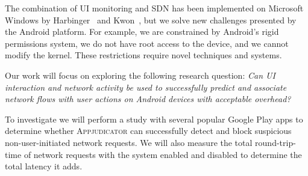 The combination of UI monitoring and SDN has been implemented on Microsoft Windows by Harbinger~\cite{chuluundorj2019} and Kwon~\etal \cite{kwon2011}, but we solve new challenges presented by the Android platform. For example, we are constrained by Android's rigid permissions system, we do not have root access to the device, and we cannot modify the kernel. These restrictions require novel techniques and systems.

Our work will focus on exploring the following research question: \textit{Can UI interaction and network activity be used to successfully predict and associate network flows with user actions on Android devices with acceptable overhead?}

To investigate we will perform a study with several popular Google Play apps to determine whether \textsc{Appjudicator} can successfully detect and block suspicious non-user-initiated network requests. We will also measure the total round-trip-time of network requests with the system enabled and disabled to determine the total latency it adds.

\newpage
